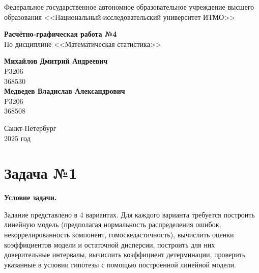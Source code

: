 \documentclass[12pt]{article}
\begin{document}
	
	\begin{titlepage}
		\begin{center}
			\large{Федеральное государственное автономное образовательное учреждение высшего образования <<Национальный исследовательский университет ИТМО>>}
		\end{center}
		
		\vspace{15em}
		
		\begin{center}
			\huge{\textbf{Расчётно-графическая работа №4}} \\
			\large{По дисциплине <<Математическая статистика>>}
		\end{center}
		
		\vspace{5em}
		
		\begin{flushright}
			\Large{\textbf{Михайлов Дмитрий Андреевич}} \\
			\Large{P3206} \\
			\Large{368530} \\
			\Large{\textbf{Медведев Владислав Александрович}} \\
			\Large{P3206} \\
			\Large{368508}
		\end{flushright}
		
		\vspace{10em}
		
		\begin{center}
			Санкт-Петербург \\
			2025 год
		\end{center}
	\end{titlepage}
	
	\tableofcontents
	\newpage
	
	\section*{Задача №1}
	
	\textbf{Условие задачи.}
	
	Задание представлено в 4 вариантах. Для каждого варианта требуется построить линейную модель (предполагая нормальность распределения ошибок, некоррелированность компонент, гомоскедастичность), вычислить оценки коэффициентов модели и остаточной дисперсии, построить для них доверительные интервалы, вычислить коэффициент детерминации, проверить указанные в условии гипотезы с помощью построенной линейной модели.
	
\end{document}
